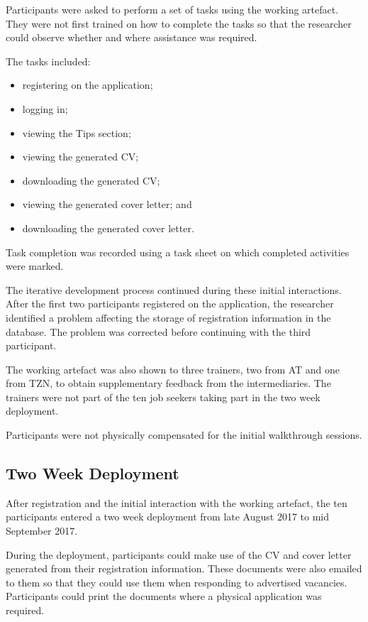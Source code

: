 Participants were asked to perform a set of tasks using the working artefact. They were not first trained on how to complete the tasks so that the researcher could observe whether and where assistance was required.

The tasks included:

\begin{itemize}
    \item registering on the application;
    \item logging in;
    \item viewing the Tips section;
    \item viewing the generated CV;
    \item downloading the generated CV;
    \item viewing the generated cover letter; and
    \item downloading the generated cover letter.
\end{itemize}

Task completion was recorded using a task sheet on which completed activities were marked.

The iterative development process continued during these initial interactions. After the first two participants registered on the application, the researcher identified a problem affecting the storage of registration information in the database. The problem was corrected before continuing with the third participant.

The working artefact was also shown to three trainers, two from AT and one from TZN, to obtain supplementary feedback from the intermediaries. The trainers were not part of the ten job seekers taking part in the two week deployment.

Participants were not physically compensated for the initial walkthrough sessions.


\subsection{Two Week Deployment}
\label{sec:two-week-deployment}

After registration and the initial interaction with the working artefact, the ten participants entered a two week deployment from late August 2017 to mid September 2017.

During the deployment, participants could make use of the CV and cover letter generated from their registration information. These documents were also emailed to them so that they could use them when responding to advertised vacancies. Participants could print the documents where a physical application was required.

